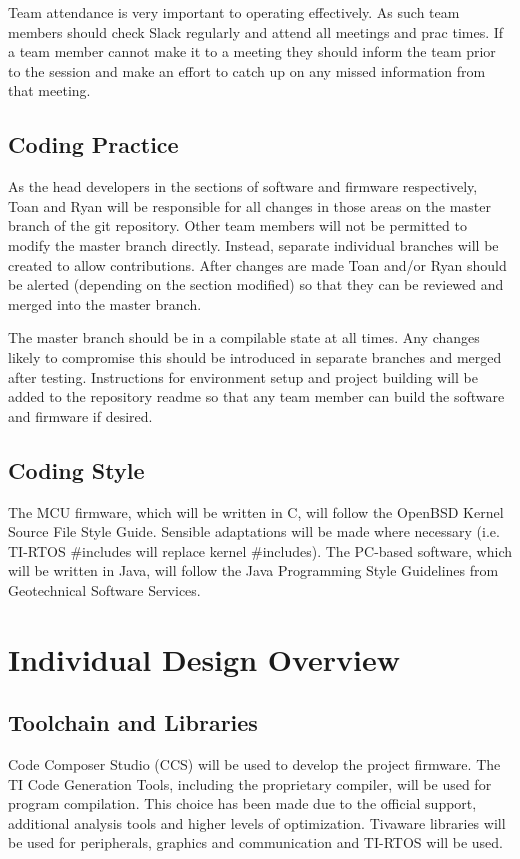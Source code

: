 \documentclass[12pt]{report}
\begin{document}
Team attendance is very important to operating effectively. As such team members should check Slack regularly and attend all meetings and prac times. If a team member cannot make it to a meeting they should inform the team prior to the session and make an effort to catch up on any missed information from that meeting.
\section{Coding Practice}
As the head developers in the sections of software and firmware respectively, Toan and Ryan will be responsible for all changes in those areas on the master branch of the git repository. Other team members will not be permitted to modify the master branch directly. Instead, separate individual branches will be created to allow contributions. After changes are made Toan and/or Ryan should be alerted (depending on the section modified) so that they can be reviewed and merged into the master branch.

The master branch should be in a compilable state at all times. Any changes likely to compromise this should be introduced in separate branches and merged after testing. Instructions for environment setup and project building will be added to the repository readme so that any team member can build the software and firmware if desired.
\section{Coding Style}
The MCU firmware, which will be written in C, will follow the OpenBSD Kernel Source File Style Guide\cite{CStyle}. Sensible adaptations will be made where necessary (i.e. TI-RTOS \#includes will replace kernel \#includes).
The PC-based software, which will be written in Java, will follow the Java Programming Style Guidelines from Geotechnical Software Services\cite{JavaStyle}. 

\chapter{Individual Design Overview}
\section{Toolchain and Libraries}
Code Composer Studio (CCS) will be used to develop the project firmware. The TI Code Generation Tools, including the proprietary compiler, will be used for program compilation. This choice has been made due to the official support, additional analysis tools and higher levels of optimization\cite{TICompilers}. Tivaware libraries will be used for peripherals, graphics and communication and TI-RTOS will be used.
\end{document}
